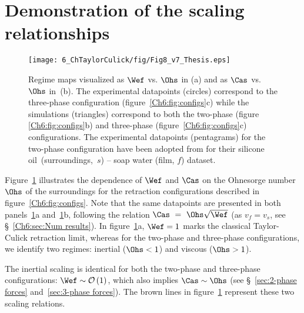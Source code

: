 \section{Demonstration of the scaling relationships}\label{sec:scaling}
\begin{sidewaysfigure}
	\centering
	\texttt{[image: 6\_ChTaylorCulick/fig/Fig8\_v7\_Thesis.eps]}
	\caption{Regime maps visualized as $\Wef$ vs. $\Ohs$ in (a) and as $\Cas$ vs. $\Ohs$ in~(b). The experimental datapoints (circles) correspond to the three-phase configuration (figure~\ref{Ch6:fig:configs}c) while the simulations (triangles) correspond to both the two-phase (figure \ref{Ch6:fig:configs}b) and three-phase (figure~\ref{Ch6:fig:configs}c) configurations. The experimental datapoints (pentagrams) for the two-phase configuration have been adopted from \citet{reyssat-2006-epl} for their silicone oil~(surroundings,~$s$) -- soap water (film, $f$) dataset.}
	\label{fig:scalingFinal}
\end{sidewaysfigure}

Figure~\ref{fig:scalingFinal} illustrates the dependence of $\Wef$ and $\Cas$ on the Ohnesorge number $\Ohs$ of the surroundings for the retraction configurations described in figure~\ref{Ch6:fig:configs}. Note that the same datapoints are presented in both panels~\ref{fig:scalingFinal}a and~\ref{fig:scalingFinal}b, following the relation $\Cas~=~\Ohs\sqrt{\Wef}$ (as $v_f = v_s$, see \S~\ref{Ch6:sec:Num results}). In figure~\ref{fig:scalingFinal}a, $\Wef = 1$ marks the classical Taylor-Culick retraction limit, whereas for the two-phase and three-phase configurations, we identify two regimes: inertial ($\Ohs < 1$) and viscous ($\Ohs > 1$). 

The inertial scaling is identical for both the two-phase and three-phase configurations: $\Wef \sim \mathcal{O}\left(1\right)$, which also implies $\Cas \sim \Ohs$ (see \S~\ref{sec:2-phase forces} and~\ref{sec:3-phase forces}). The brown lines in figure~\ref{fig:scalingFinal} represent these two scaling relations.

